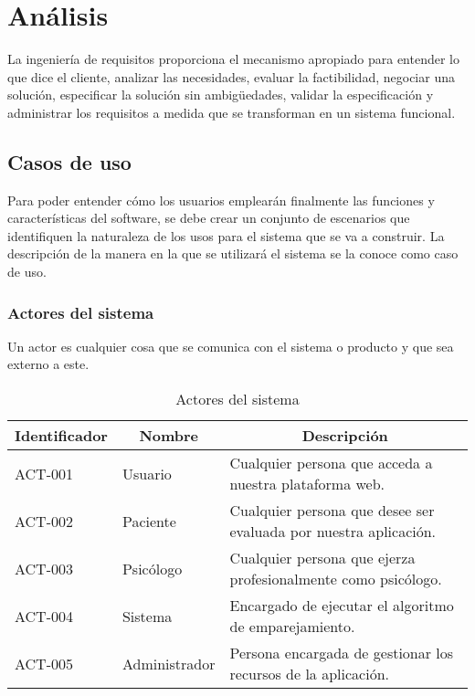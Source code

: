 \section{Análisis}

La ingeniería de requisitos proporciona el mecanismo apropiado para entender lo que dice el cliente, analizar las necesidades, evaluar la factibilidad, negociar una solución, especificar la solución sin ambigüedades, validar la especificación y administrar los requisitos a medida que se transforman en un sistema funcional\cite{pressman}.

\subsection{Casos de uso}
Para poder entender cómo los usuarios emplearán finalmente las funciones y características del software, se debe crear un conjunto de escenarios que identifiquen la naturaleza de los usos para el sistema que se va a construir. La descripción de la manera en la que se utilizará el sistema se la conoce como caso de uso.

\subsubsection{Actores del sistema}
Un actor es cualquier cosa que se comunica con el sistema o producto y que sea externo a este. 

\begin{table}[htpb]
\centering
\caption{Actores del sistema}
\label{tab_actores}
\begin{tabularx}{\textwidth}{|l|X|X|}
\hline
\multicolumn{1}{|c|}{Identificador} & \multicolumn{1}{c|}{Nombre} & \multicolumn{1}{c|}{Descripción}                                 \\ \hline
ACT-001                             & Usuario                     & Cualquier persona que acceda a nuestra plataforma web.           \\ \hline
ACT-002                             & Paciente                    & Cualquier persona que desee ser evaluada por nuestra aplicación. \\ \hline
ACT-003                             & Psicólogo                   & Cualquier persona que ejerza profesionalmente como psicólogo.    \\ \hline
ACT-004                             & Sistema                     & Encargado de ejecutar el algoritmo de emparejamiento.            \\ \hline
ACT-005                             & Administrador               & Persona encargada de gestionar los recursos de la aplicación.    \\ \hline
\end{tabularx}
\end{table}


